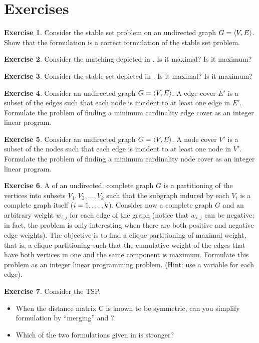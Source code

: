 \documentclass[titlepage]{book}
\makeatletter
\newcommand{\concept}[2]{\toindex{#1}}
\newcommand\toindex{\@ifstar{\@dblarg{\@toindexs}}{\@toindex}}
\def\@toindexs[#1]#2{\indexlayout{#2}\index{#1@#2}}
\newcommand\@toindex[2][]{%
  \if\relax\detokenize{#1}\relax
    \indexlayout{#2}%
    \begingroup
    \@splitword#2\@nil%
    \uppercase\expandafter{%
      \expandafter\def\expandafter\@initial\expandafter{\@first}}%
    \toks0=\expandafter{\@initial}%
    \toks2=\expandafter{\@rest}%
    \edef\x{\endgroup\noexpand\index{\the\toks0 \the\toks2 }}\x
  \else
    \indexlayout{#2}\index{#1}
  \fi
}
\def\@splitword#1#2\@nil{\def\@first{#1}\def\@rest{#2}}
\newcommand{\indexlayout}[1]{\emph{#1}}
\theoremstyle{plain}
\theoremstyle{definition}
\newtheorem{exercise}{Exercise}[chapter]
\theoremstyle{remark}
\makeatother
\begin{document}
\section*{Exercises}
\begin{exercise}
Consider the stable set problem on an undirected graph $G=\tupl{V,E}$. Show that the formulation  is a correct formulation of the stable set problem.
\end{exercise}
\begin{exercise}
Consider the matching depicted in . Is it maximal? Is it maximum?
\end{exercise}
\begin{exercise}
Consider the stable set depicted in . Is it maximal? Is it maximum?
\end{exercise}
\begin{exercise}
Consider an undirected graph $G=\tupl{V,E}$. A edge cover $E'$ is a subset of the edges such that each node is incident to at least one edge in $E'$. Formulate the problem of finding a minimum cardinality edge cover as an integer linear program.
\end{exercise}
\begin{exercise}
Consider an undirected graph $G=\tupl{V,E}$. A node cover $V'$ is a subset of the nodes such that each edge is incident to at least one node in $V'$. Formulate the problem of finding a minimum cardinality node cover as an integer linear program.
\end{exercise}
\begin{exercise}
A \concept{clique partitioning}{} of an undirected, complete graph $G$ is a partitioning of the vertices into subsets $V_1,V_2,\ldots,V_k$ such that the subgraph induced by each $V_i$ is a complete graph itself ($\rangei[i]{1}{k}$). Consider now a complete graph $G$ and an arbitrary weight $w_{i,j}$ for each edge of the graph (notice that $w_{i,j}$ can be negative; in fact, the problem is only interesting when there are both positive and negative edge weights). The objective is to find a clique partitioning of maximal weight, that is, a clique partitioning such that the cumulative weight of the edges that have both vertices in one and the same component is maximum. Formulate this problem as an integer linear programming problem. (Hint: use a variable for each edge).
\end{exercise}
\begin{exercise}
Consider the TSP.
\begin{itemize}
 \item When the distance matrix C is known to be symmetric, can you simplify formulation  by ``merging''  and ?
 \item Which of the two formulations given in  is stronger?
\end{itemize}
\end{exercise}
\end{document}
